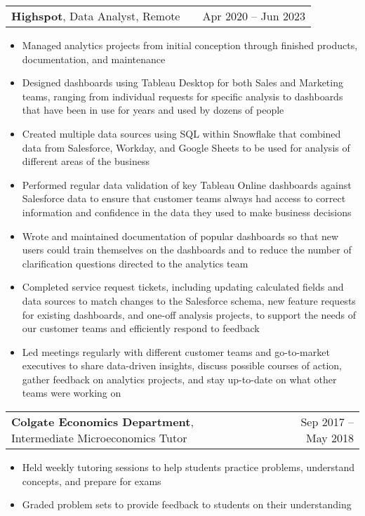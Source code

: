 \documentclass[a4paper,12pt]{article}
\makeatletter
\newenvironment{joblong}[2]
    {
    \begin{tabularx}{\linewidth}{@{}l X r@{}}
    #1 & \hfill &  #2 \\[3.75pt]
    \end{tabularx}
    \begin{minipage}[t]{\linewidth}
    \begin{itemize}[nosep,after=\strut, leftmargin=1em, itemsep=3pt,label=--]
    }
    {
    \end{itemize}
    \end{minipage}    
    }
\makeatother
\begin{document}
\begin{joblong}{\textbf{Highspot}, Data Analyst, Remote}{Apr 2020 -- Jun 2023}
\item Managed analytics projects from initial conception through finished products, documentation, and maintenance
\item Designed dashboards using Tableau Desktop for both Sales and Marketing teams, ranging from individual requests for specific analysis to dashboards that have been in use for years and used by dozens of people
\item Created multiple data sources using SQL within Snowflake that combined data from Salesforce, Workday, and Google Sheets to be used for analysis of different areas of the business
\item Performed regular data validation of key Tableau Online dashboards against Salesforce data to ensure that customer teams always had access to correct information and confidence in the data they used to make business decisions
\item Wrote and maintained documentation of popular dashboards so that new users could train themselves on the dashboards and to reduce the number of clarification questions directed to the analytics team
\item Completed service request tickets, including updating calculated fields and data sources to match changes to the Salesforce schema, new feature requests for existing dashboards, and one-off analysis projects, to support the needs of our customer teams and efficiently respond to feedback
\item Led meetings regularly with different customer teams and go-to-market executives to share data-driven insights, discuss possible courses of action, gather feedback on analytics projects, and stay up-to-date on what other teams were working on
\end{joblong}

\begin{joblong}{\textbf{Colgate Economics Department}, Intermediate Microeconomics Tutor}{Sep 2017 -- May 2018}
\item Held weekly tutoring sessions to help students practice problems, understand concepts, and prepare for exams
\item Graded problem sets to provide feedback to students on their understanding
\end{joblong}

\end{document}
